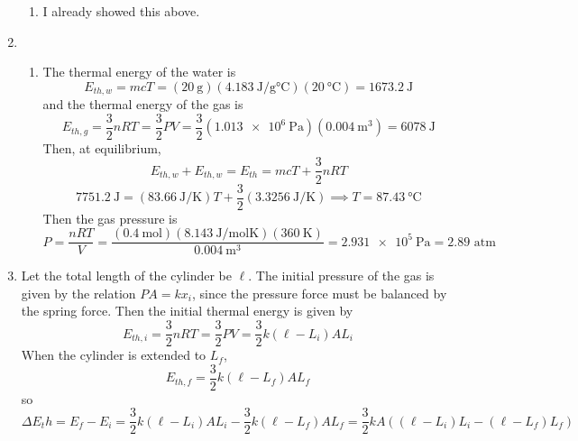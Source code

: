 \documentclass[fleqn]{article}[12pt]
\begin{document}
\begin{enumerate}
\begin{enumerate}
        \item I already showed this above.
    \end{enumerate}

    \item \begin{enumerate}
        \item The thermal energy of the water is
        \begin{equation*}
            E_{th,w} = m c T = (\SI{20}{\gram})(\SI{4.183}{\joule/\g\celsius})(\SI{20}{\celsius}) = \SI{1673.2}{\joule}
        \end{equation*}
        and the thermal energy of the gas is
        \begin{equation*}
            E_{th,g} = \frac{3}{2}nRT = \frac{3}{2}PV = \frac{3}{2} (\SI{1.013e6}{\pascal})(\SI{0.004}{\m^3}) = \SI{6078}{\joule}
        \end{equation*}
        Then, at equilibrium,
        \begin{equation*}
            E_{th,w} + E_{th,w} = E_{th} = m c T + \frac{3}{2}nRT
        \end{equation*}
        \begin{equation*}
            \SI{7751.2}{\joule} = (\SI{83.66}{\joule/\kelvin})T + \frac{3}{2} (\SI{3.3256}{\joule/\kelvin}) \implies T = \SI{87.43}{\celsius}
        \end{equation*}
        Then the gas pressure is
        \begin{equation*}
            P = \frac{nRT}{V} = \frac{(\SI{0.4}{\mol})(\SI{8.143}{\joule/\mol\kelvin})(\SI{360}{\kelvin})}{\SI{0.004}{\m^3}} =
            \SI{2.931e5}{\pascal} = 2.89 \text{ atm}
        \end{equation*}
    \end{enumerate}

    \item Let the total length of the cylinder be $\ell$. The initial pressure of the gas is given by the relation $PA = kx_i$, since the pressure force must be balanced by the spring force. Then the initial thermal energy is given by
    \begin{equation*}
        E_{th,i} = \frac{3}{2}nRT = \frac{3}{2}PV = \frac{3}{2}k(\ell-L_i)AL_i
    \end{equation*}
    When the cylinder is extended to $L_f$,
    \begin{equation*}
        E_{th,f} = \frac{3}{2}k(\ell-L_f)AL_f
    \end{equation*}
    so
    \begin{equation*}
        \Delta E_th = E_f - E_i = \frac{3}{2}k(\ell-L_i)AL_i - \frac{3}{2}k(\ell-L_f)AL_f = \frac{3}{2}kA((\ell-L_i)L_i - (\ell-L_f)L_f)
    \end{equation*}
\end{enumerate}
\end{document}
